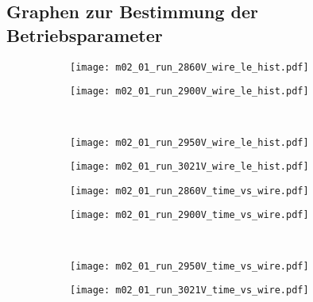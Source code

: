 \documentclass[11pt, ngerman, fleqn, DIV=15, headinclude, BCOR=2cm]{scrreprt}
\begin{document}
\begin{appendix}

	\chapter{Graphen zur Bestimmung der Betriebsparameter}


	\begin{figure}
		\centering
	\begin{subfigure}[a]{0.45 \textwidth}
		\texttt{[image: m02\_01\_run\_2860V\_wire\_le\_hist.pdf]}
		\caption{%
		}
		\label{fig:m02_01_run_2860V_wire_le_hist}
	\end{subfigure}
	\begin{subfigure}[a]{0.45 \textwidth}
		\texttt{[image: m02\_01\_run\_2900V\_wire\_le\_hist.pdf]}
		\caption{%
		}
		\label{fig:m02_01_run_2900V_wire_le_hist}
	\end{subfigure}\\
	\begin{subfigure}[a]{0.45 \textwidth}
		\texttt{[image: m02\_01\_run\_2950V\_wire\_le\_hist.pdf]}
		\caption{%
		}
		\label{fig:m02_01_run_2950V_wire_le_hist}
	\end{subfigure}
	\begin{subfigure}[a]{0.45 \textwidth}
		\texttt{[image: m02\_01\_run\_3021V\_wire\_le\_hist.pdf]}
		\caption{%
		}
		\label{fig:m02_01_run_3021V_wire_le_hist}
	\end{subfigure}
	\caption{%
	}
	\label{fig:m02_01_wire_le_hist}
	\end{figure}


	\begin{figure}
		\centering
	\begin{subfigure}[a]{0.45 \textwidth}
		\texttt{[image: m02\_01\_run\_2860V\_time\_vs\_wire.pdf]}
		\caption{%
		}
		\label{fig:m02_01_run_2860V_time_vs_wire}
	\end{subfigure}
	\begin{subfigure}[a]{0.45 \textwidth}
		\texttt{[image: m02\_01\_run\_2900V\_time\_vs\_wire.pdf]}
		\caption{%
		}
		\label{fig:m02_01_run_2900V_time_vs_wire}
	\end{subfigure}
	\\
	\begin{subfigure}[a]{0.45 \textwidth}
		\texttt{[image: m02\_01\_run\_2950V\_time\_vs\_wire.pdf]}
		\caption{%
		}
		\label{fig:m02_01_run_2950V_time_vs_wire}
	\end{subfigure}
	\begin{subfigure}[a]{0.45 \textwidth}
		\texttt{[image: m02\_01\_run\_3021V\_time\_vs\_wire.pdf]}
		\caption{%
		}
		\label{fig:m02_01_run_3021V_time_vs_wire}
	\end{subfigure}
	\caption{%
	}
	\label{fig:m02_01_time_vs_wire}
	\end{figure}




\end{appendix}
\end{document}
